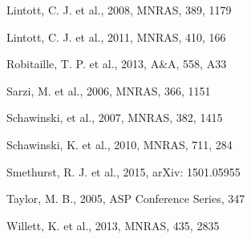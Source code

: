 \documentclass[useAMS,usenatbib]{mn2e}
\begin{document}
\begin{thebibliography}{}

 Lintott, C. J. et al., 2008, MNRAS, 389, 1179

 Lintott, C. J. et al., 2011, MNRAS, 410, 166

 Robitaille, T. P. et al., 2013, A\&A, 558, A33

 Sarzi, M. et al., 2006, MNRAS, 366, 1151

 Schawinski, et al., 2007, MNRAS, 382, 1415

 Schawinski, K. et al., 2010, MNRAS, 711, 284

 Smethurst, R. J. et al., 2015, arXiv: 1501.05955

 Taylor, M. B., 2005, ASP Conference Series, 347

 Willett, K. et al., 2013, MNRAS, 435, 2835

\end{thebibliography}{}

\appendix
\end{document}
